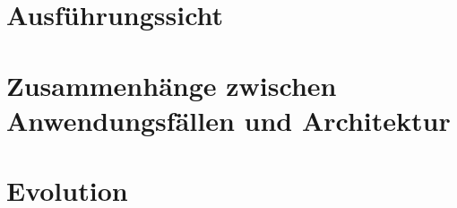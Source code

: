 \documentclass[fontsize=12pt,paper=a4,twoside]{scrartcl}
\begin{document}
\section{Ausführungssicht} \label{sec:ausfuehrung}


\section{Zusammenhänge zwischen Anwendungsfällen und Architektur} \label{sec:zusammenhang}



\section{Evolution} \label{sec:evolution}

\end{document}

